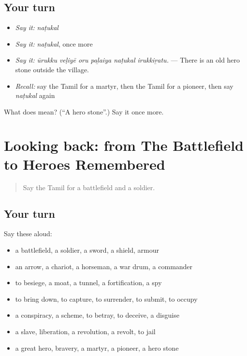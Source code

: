 \subsection*{Your turn}
\begin{itemize}
\raggedright
  \item \emph{Say it:} \emph{naṭukal}
  \item \emph{Say it:} \emph{naṭukal}, once more
  \item \emph{Say it:} \emph{ūrukku veḷiyē oru paḻaiya naṭukal irukkiṟatu.} — There is an old hero stone outside the village.
  \item \emph{Recall:} say the Tamil for a martyr, then the Tamil for a pioneer, then say \emph{naṭukal} again
\end{itemize}

\begin{tcolorbox}[breakable,colback=teal!4,colframe=teal!35!black,title={Before you move on}]
What does  mean? (\textquotedblleft{}A hero stone\textquotedblright{}.) Say it once more.
\end{tcolorbox}
\section[(dialogue)]{Looking back: from The Battlefield to Heroes Remembered}

\label{lesson:TA-R339-review-333-339}



\begin{quote}
Say the Tamil for a battlefield and a soldier.
\end{quote}

\subsection*{Your turn}
Say these aloud:

\begin{itemize}
\raggedright
  \item a battlefield, a soldier, a sword, a shield, armour
  \item an arrow, a chariot, a horseman, a war drum, a commander
  \item to besiege, a moat, a tunnel, a fortification, a spy
  \item to bring down, to capture, to surrender, to submit, to occupy
  \item a conspiracy, a scheme, to betray, to deceive, a disguise
  \item a slave, liberation, a revolution, a revolt, to jail
  \item a great hero, bravery, a martyr, a pioneer, a hero stone
\end{itemize}

